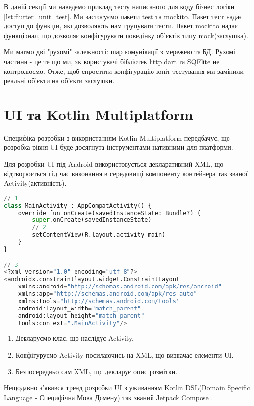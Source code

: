 В даній секції ми наведемо приклад тесту написаного для коду бізнес логіки \ref{lst:flutter_unit_test}.
Ми застосуємо пакети test та mockito.
Пакет тест надає доступ до функцій, які дозволяють нам групувати тести.
Пакет mockito надає функціонал, що дозволяє конфігурувати поведінку об'єктів типу mock(заглушка).

Ми маємо дві "рухомі" залежності: шар комунікації з мережею та БД.
Рухомі частини - це те що ми, як користувачі бібліотек http.dart та SQFlite не контролюємо.
Отже, щоб спростити конфігурацію юніт тестування ми замінили реальні об'єкти на об'єкти заглушки.


\section{UI та Kotlin Multiplatform}
\label{section.2.8}
Специфіка розробки з використанням Kotlin Multiplatform передбачує, що розробка рівня UI буде досягнута
інструментами нативними для платформи.

Для розробки UI під Android використовується декларативний XML, що відтворюється під час виконання в середовищі компоненту
контейнера так званої Activity(активність).
\begin{lstlisting}[style=light, language=Python,label={lst:android_xml},caption=Android UI with XML]
// 1
class MainActivity : AppCompatActivity() {
    override fun onCreate(savedInstanceState: Bundle?) {
        super.onCreate(savedInstanceState)
        // 2
        setContentView(R.layout.activity_main)
    }
}

// 3
<?xml version="1.0" encoding="utf-8"?>
<androidx.constraintlayout.widget.ConstraintLayout
    xmlns:android="http://schemas.android.com/apk/res/android"
    xmlns:app="http://schemas.android.com/apk/res-auto"
    xmlns:tools="http://schemas.android.com/tools"
    android:layout_width="match_parent"
    android:layout_height="match_parent"
    tools:context=".MainActivity"/>
\end{lstlisting}

\begin{enumerate}
    \item Декларуємо клас, що наслідує Activity.
    \item Конфігуруємо Activity посилаючись на XML, що визначає елементи UI.
    \item Безпосередньо сам XML, що декларує опис розмітки.
\end{enumerate}

Нещодавно з'явився тренд розробки UI з уживанням
Kotlin DSL(Domain Specific Language - Специфічна Мова Домену) так званий Jetpack Compose \cite{jetpack_compose}.


